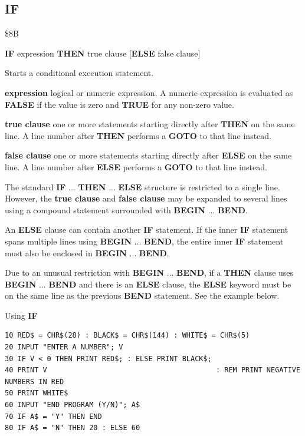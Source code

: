 \subsection{IF}
\begin{description}[leftmargin=2cm,style=nextline]
\item [Token:]    \$8B

\item [Format:]   {\bf IF} expression {\bf THEN} true clause [{\bf ELSE} false clause]

\item [Usage:]    Starts a conditional execution statement.

                  {\bf expression} logical or numeric expression. A numeric expression is evaluated as {\bf FALSE} if the value is zero and {\bf TRUE} for any non-zero value.

                  {\bf true clause} one or more statements starting directly after {\bf THEN} on the same line. A line number after {\bf THEN} performs a {\bf GOTO} to that line instead.

                  {\bf false clause} one or more statements starting directly after {\bf ELSE} on the same line. A line number after {\bf ELSE} performs a {\bf GOTO} to that line instead.

\item [Remarks:]  The standard {\bf IF} ... {\bf THEN} ... {\bf ELSE} structure is restricted to a single line. However, the {\bf true clause} and {\bf false clause} may be expanded to several lines using a compound statement surrounded with {\bf BEGIN} ... {\bf BEND}.

                  An {\bf ELSE} clause can contain another {\bf IF} statement. If the inner {\bf IF} statement spans multiple lines using {\bf BEGIN} ... {\bf BEND}, the entire inner {\bf IF} statement must also be enclosed in {\bf BEGIN} ... {\bf BEND}.

                  Due to an unusual restriction with {\bf BEGIN} ... {\bf BEND}, if a {\bf THEN} clause uses {\bf BEGIN} ... {\bf BEND} and there is an {\bf ELSE} clause, the {\bf ELSE} keyword must be on the same line as the previous {\bf BEND} statement. See the example below.

\item [Example:]  Using {\bf IF}

\begin{tcolorbox}[colback=black,coltext=white]
\verbatimfont{\codefont}
\begin{verbatim}
10 RED$ = CHR$(28) : BLACK$ = CHR$(144) : WHITE$ = CHR$(5)
20 INPUT "ENTER A NUMBER"; V
30 IF V < 0 THEN PRINT RED$; : ELSE PRINT BLACK$;
40 PRINT V                                        : REM PRINT NEGATIVE NUMBERS IN RED
50 PRINT WHITE$
60 INPUT "END PROGRAM (Y/N)"; A$
70 IF A$ = "Y" THEN END
80 IF A$ = "N" THEN 20 : ELSE 60


\end{verbatim}
\end{tcolorbox}
\end{description}
